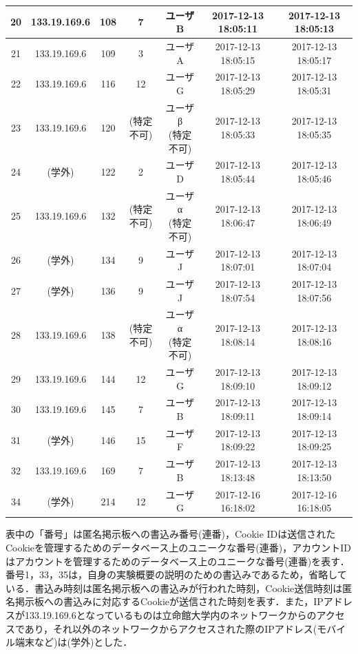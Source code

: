 \documentclass[10pt, a4paper]{jreport}
\begin{document}
\begin{table}[H]
\begin{center}
{\begin{tabular}{ | c | c | c | c | c | c | c | }
20 & 133.19.169.6 & 108 & 7 & ユーザB & 2017-12-13 18:05:11 & 2017-12-13 18:05:13 \\ \hline
21 & 133.19.169.6 & 109 & 3 & ユーザA & 2017-12-13 18:05:15 & 2017-12-13 18:05:17 \\ \hline
22 & 133.19.169.6 & 116 & 12 & ユーザG & 2017-12-13 18:05:29 & 2017-12-13 18:05:31 \\ \hline
23 & 133.19.169.6 & 120 & (特定不可) & \shortstack{ユーザβ\\(特定不可)} & 2017-12-13 18:05:33 & 2017-12-13 18:05:35 \\ \hline
24 & (学外) & 122 & 2 & ユーザD & 2017-12-13 18:05:44 & 2017-12-13 18:05:46 \\ \hline
25 & 133.19.169.6 & 132 & (特定不可) & \shortstack{ユーザα\\(特定不可)} & 2017-12-13 18:06:47 & 2017-12-13 18:06:49 \\ \hline
26 & (学外) & 134 & 9 & ユーザJ & 2017-12-13 18:07:01 & 2017-12-13 18:07:04 \\ \hline
27 & (学外) & 136 & 9 & ユーザJ & 2017-12-13 18:07:54 & 2017-12-13 18:07:56 \\ \hline
28 & 133.19.169.6 & 138 & (特定不可) & \shortstack{ユーザα\\(特定不可)} & 2017-12-13 18:08:14 & 2017-12-13 18:08:16 \\ \hline
29 & 133.19.169.6 & 144 & 12 & ユーザG & 2017-12-13 18:09:10 & 2017-12-13 18:09:12 \\ \hline
30 & 133.19.169.6 & 145 & 7 & ユーザB & 2017-12-13 18:09:11 & 2017-12-13 18:09:14 \\ \hline
31 & (学外) & 146 & 15 & ユーザF & 2017-12-13 18:09:22 & 2017-12-13 18:09:25 \\ \hline
32 & 133.19.169.6 & 169 & 7 & ユーザB & 2017-12-13 18:13:48 & 2017-12-13 18:13:50 \\ \hline
34 & (学外) & 214 & 12 & ユーザG & 2017-12-16 16:18:02 & 2017-12-16 16:18:05 \\ \hline

			\end{tabular}
		}
	\end{center}
\end{table}


表中の「番号」は匿名掲示板への書込み番号(連番)，Cookie IDは送信されたCookieを管理するためのデータベース上のユニークな番号(連番)，アカウントIDはアカウントを管理するためのデータベース上のユニークな番号(連番)を表す．番号1，33，35は，自身の実験概要の説明のための書込みであるため，省略している．書込み時刻は匿名掲示板への書込みが行われた時刻，Cookie送信時刻は匿名掲示板への書込みに対応するCookieが送信された時刻を表す．また，IPアドレスが133.19.169.6となっているものは立命館大学内のネットワークからのアクセスであり，それ以外のネットワークからアクセスされた際のIPアドレス(モバイル端末など)は(学外)とした．
\end{document}
